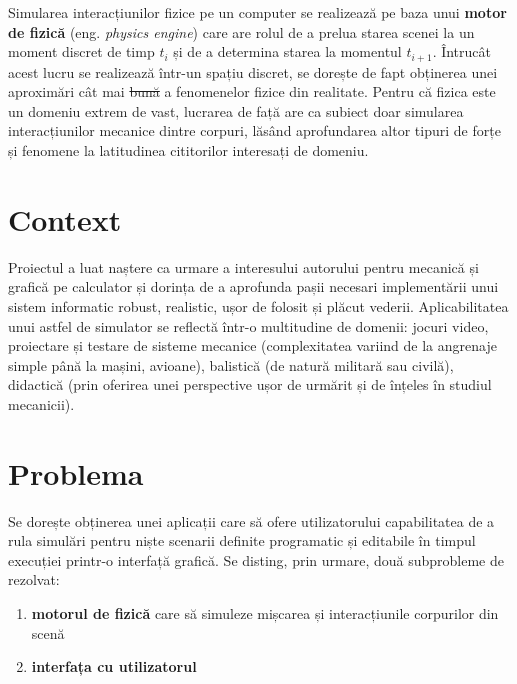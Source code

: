 \documentclass[12pt,a4paper]{report}
\newcommand{\worktype}[1]{[\textit{#1}] }
\newcommand{\dezvoltare}{\worktype{Dezvoltare de produs}}
\newcommand{\cercetare}{\worktype{Cercetare}}
\providecommand{\DIFaddtex}[1]{{\protect\color{blue}\uwave{#1}}} %
\providecommand{\DIFdeltex}[1]{{\protect\color{red}\sout{#1}}}                      %
\providecommand{\DIFaddbegin}{} %
\providecommand{\DIFaddend}{} %
\providecommand{\DIFdelbegin}{} %
\providecommand{\DIFdelend}{} %
\providecommand{\DIFadd}[1]{\texorpdfstring{\DIFaddtex{#1}}{#1}} %
\providecommand{\DIFdel}[1]{\texorpdfstring{\DIFdeltex{#1}}{}} %
\newcommand{\DIFscaledelfig}{0.5}
\newlength{\DIFdelgraphicswidth} %
\newlength{\DIFdelgraphicsheight} %
\newcommand{\DIFaddincludegraphics}[2][]{{\color{blue}\fbox{\DIFOincludegraphics[#1]{#2}}}} %
\newcommand{\DIFdelincludegraphics}[2][]{%
	\sbox{\DIFdelgraphicsbox}{\DIFOincludegraphics[#1]{#2}}%
	\settoboxwidth{\DIFdelgraphicswidth}{\DIFdelgraphicsbox} %
	\settoboxtotalheight{\DIFdelgraphicsheight}{\DIFdelgraphicsbox} %
	\scalebox{\DIFscaledelfig}{%
		\parbox[b]{\DIFdelgraphicswidth}{\usebox{\DIFdelgraphicsbox}\\[-\baselineskip] \rule{\DIFdelgraphicswidth}{0em}}\llap{\resizebox{\DIFdelgraphicswidth}{\DIFdelgraphicsheight}{%
				\setlength{\unitlength}{\DIFdelgraphicswidth}%
				\begin{picture}(1,1)%
				\thicklines\linethickness{2pt} %
				{\color[rgb]{1,0,0}\put(0,0){\framebox(1,1){}}}%
				{\color[rgb]{1,0,0}\put(0,0){\line( 1,1){1}}}%
				{\color[rgb]{1,0,0}\put(0,1){\line(1,-1){1}}}%
				\end{picture}%
			}\hspace*{3pt}}} %
} %
\DeclareRobustCommand{\DIFaddbegin}{\DIFOaddbegin \let\includegraphics\DIFaddincludegraphics} %
\DeclareRobustCommand{\DIFaddend}{\DIFOaddend \let\includegraphics\DIFOincludegraphics} %
\DeclareRobustCommand{\DIFdelbegin}{\DIFOdelbegin \let\includegraphics\DIFdelincludegraphics} %
\DeclareRobustCommand{\DIFdelend}{\DIFOaddend \let\includegraphics\DIFOincludegraphics} %
\begin{document}
	Simularea interacțiunilor fizice pe un computer se realizează pe baza unui \textbf{motor de fizică} (eng. \textit{physics engine}) care are rolul de a prelua starea scenei la un moment discret de timp $t_i$ și de a determina starea la momentul $t_{i+1}$. Întrucât acest lucru se realizează într-un spațiu discret, se dorește de fapt obținerea unei aproximări cât mai \DIFdelbegin \DIFdel{bună }\DIFdelend \DIFaddbegin \DIFadd{bune }\DIFaddend a fenomenelor fizice din realitate. Pentru că fizica este un domeniu extrem de vast, lucrarea de față are ca subiect doar simularea interacțiunilor mecanice dintre corpuri, lăsând aprofundarea altor tipuri de forțe și fenomene la latitudinea cititorilor interesați de domeniu. 
	\section{Context}
	Proiectul a luat naștere ca urmare a interesului autorului pentru mecanică și grafică pe calculator și dorința de a aprofunda pașii necesari implementării unui sistem informatic robust, realistic, ușor de folosit și plăcut vederii.
	Aplicabilitatea unui astfel de simulator se reflectă într-o multitudine de domenii: jocuri video, proiectare și testare de sisteme mecanice (complexitatea variind de la angrenaje simple până la mașini, avioane), balistică (de natură militară sau civilă), didactică (prin oferirea unei perspective ușor de urmărit și de înțeles în studiul mecanicii).
	\section{Problema} 
	Se dorește obținerea unei aplicații care să ofere utilizatorului capabilitatea de a rula simulări pentru niște scenarii definite programatic și editabile în timpul execuției printr-o interfață grafică.
	Se disting, prin urmare, două subprobleme de rezolvat:
	\begin{enumerate}
		\item \textbf{motorul de fizică} care să simuleze mișcarea și interacțiunile corpurilor din scenă
		\item \textbf{interfața cu utilizatorul}
	\end{enumerate}
\end{document}
